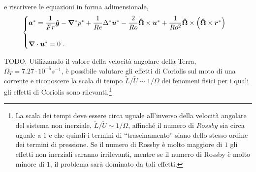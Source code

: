 e riscrivere le equazioni in forma adimensionale,
\begin{equation}
\begin{cases}
 \bm{a}^* = \dfrac{1}{Fr} \bm{\hat{g}}
   -  \bm{\nabla}^* p^*
   + \dfrac{1}{Re} \Delta^* \bm{u}^*
   - \dfrac{2}{Ro} \bm{\hat{\Omega}} \times \bm{u}^*
   + \dfrac{1}{Ro^2} \bm{\hat{\Omega}} \times \left( \bm{\hat{\Omega}} \times \bm{r}^* \right) \\ \\
 \bm{\nabla} \cdot \bm{u}^* = 0 \ .
\end{cases}
\end{equation}

{\color{red} TODO. Utilizzando il valore della velocità angolare della Terra, $\Omega_T = 7.27 \cdot 10^{-5} s^{-1}$, è possibile valutare gli effetti di Coriolis sul moto di una corrente e riconoscere la scala di tempo $\tilde{L}/\tilde{U} \sim 1/\Omega$ dei fenomeni fisici per i quali gli effetti di Coriolis sono rilevanti.\footnote{
 La scala dei tempi deve essere circa uguale all'inverso della velocità angolare del sistema non inerziale, $\tilde{L}/\tilde{U} \sim 1/\Omega$, affinché il numero di $Rossby$ sia circa uguale a $1$ e che quindi i termini di ``trascinamento'' siano dello stesso ordine dei termini di pressione. Se il numero di Rossby è molto maggiore di $1$ gli effetti non inerziali saranno irrilevanti, mentre se il numero di Rossby è molto minore di $1$, il problema sarà dominato da tali effetti.
}
}
